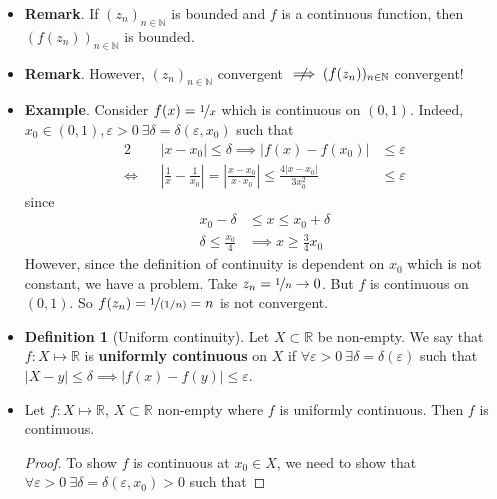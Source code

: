 \documentclass{article}
\newcommand{\R}{\mathbb{R}}
\newcommand{\N}{\mathbb{N}}
\newcommand{\seq}[2]{(#1_{#2})_{#2 \in \N}}
\newcommand{\?}{\stackrel{?}{=}}
\theoremstyle{definition} %
\newtheorem{definition}[theorem]{Definition} %
\begin{document}
\begin{itemize}
    \item \textbf{Remark}. If $\seq{z}{n}$ is bounded and $f$ is a continuous function, then $(f(z_n))_{n \in \N}$ is bounded.
    \item \textbf{Remark}. However, $\seq{z}{n}$ convergent $\centernot\implies (f(z_n))_{n \in \N}$ convergent!
    \item \textbf{Example}. Consider $f(x) = \nicefrac{1}{x}$ which is continuous on $(0, 1)$. Indeed, $x_0 \in (0, 1), \varepsilon > 0 \ \exists \delta = \delta(\varepsilon, x_0)$ such that
          \begin{alignat*}{2}
                   &  & |x - x_0| \leq \delta \implies |f(x) - f(x_0)|                                                                     & \leq \varepsilon               \\
              \iff &  & \left|\frac{1}{x} - \frac{1}{x_0}\right| = \left|\frac{x - x_0}{x \cdot x_0}\right| \leq \frac{4|x - x_0|}{3x_0^2} & \leq \varepsilon \tag{ by (*)}
          \end{alignat*}
          since
          \begin{align*}
              x_0 - \delta              & \leq x \leq x_0 + \delta               \\
              \delta \leq \frac{x_0}{4} & \implies x \geq \frac{3}{4}x_0 \tag{*}
          \end{align*}
          However, since the definition of continuity is dependent on $x_0$ which is not constant, we have a problem. Take $z_n = \nicefrac{1}{n} \rightarrow 0$. But $f$ is continuous on $(0, 1)$. So $f(z_n) = \nicefrac{1}{(1/n)} = n$ is not convergent.
    \item[]
          \begin{definition}[Uniform continuity]
              Let $X \subset \R$ be non-empty. We say that $f: X \mapsto \R$ is \textbf{uniformly continuous} on $X$ if $\forall \varepsilon > 0 \ \exists \delta = \delta(\varepsilon)$ such that $|X - y| \leq \delta \implies |f(x) - f(y)| \leq \varepsilon$.
          \end{definition}
    \item[]
          \begin{lemma}
              Let $f: X \mapsto \R$, $X \subset \R$ non-empty where $f$ is uniformly continuous. Then $f$ is continuous.
          \end{lemma}
          \begin{proof}
              To show $f$ is continuous at $x_0 \in X$, we need to show that $\forall \varepsilon > 0 \ \exists \delta = \delta(\varepsilon, x_0) > 0$ such that

\end{proof}
\end{itemize}
\end{document}
